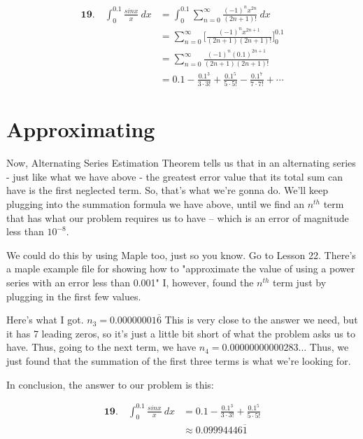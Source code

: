\begin{align}
	\textbf{19.}\quad \int_{0}^{0.1} 
	\frac{sinx}{x}\ dx
	&=
	\int_{0}^{0.1}
	\sum_{n=0}^{\infty}
	\frac{
		(-1)^nx^{2n}
	}{
		(2n+1)!
	}\ dx \\
	&=
	\sum_{n=0}^{\infty}
	\Bigg[
	\frac{
		(-1)^nx^{2n+1}
	}{
		(2n+1)
		(2n+1)!
	}
	\Bigg]_0^{0.1} \\
	&=
	\sum_{n=0}^{\infty}
	\frac{
		(-1)^n(0.1)^{2n+1}
	}{
		(2n+1)
		(2n+1)!
	} \\
	&=
	0.1 
	-
	\frac{
		0.1^{3}
	}{
	    3\cdot3!
	}
	+
	\frac{
		0.1^{5}
	}{
		5\cdot5!
	}
	-
	\frac{
		0.1^{7}
	}{
		7\cdot7!
	}
	+
	\cdots
\end{align}

\section*{Approximating}

Now, Alternating Series
Estimation Theorem tells us
that in an alternating series
- just like what we have above -
the greatest error value 
that its total sum can have 
is the first neglected term.
So, that's what we're gonna do.
We'll keep plugging into the
summation formula we have above,
until we find an $ n^{th} $ term
that has what our problem requires
us to have -- which is an error
of magnitude less than $ 10^{-8} $.

We could do this by using Maple too,
just so you know. 
Go to Lesson 22. 
There's a maple example file for
showing how to "approximate the value of  using a power series with an error less than 0.001"
I, however, found the $ n^{th} $ term
just by plugging in the first few values.

Here's what I got. 
$ n_3 = 0.00000001\overline{6} $
This is very close to the answer we
need, but it has 7 leading zeros, so
it's just a little bit short of what
the problem asks us to have. Thus,
going to the next term, we have
$ n_4 = 0.00000000000283\ldots $
Thus, we just found that the
summation of the first three terms
is what we're looking for. 

In conclusion, the answer to
our problem is this:

\begin{align}
	\textbf{19.}\quad \int_{0}^{0.1} 
	\frac{sinx}{x}\ dx
	&=
	0.1 
	-
	\frac{
		0.1^{3}
	}{
		3\cdot3!
	}
	+
	\frac{
		0.1^{5}
	}{
		5\cdot5!
	} \\
	&\approx
	0.09994446\overline{1}
\end{align}


